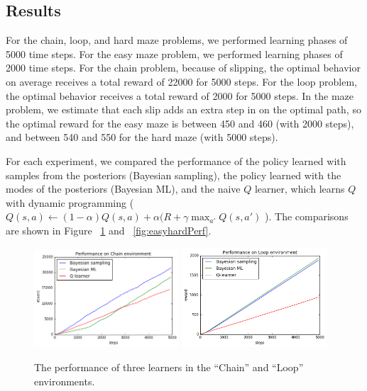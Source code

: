 \documentclass[10pt, twocolumn, twoside]{article}
\begin{document}
\subsection{Results}
For the chain, loop, and hard maze problems, we performed learning phases of 5000 time steps. For
the easy maze problem, we performed learning phases of 2000 time steps. For the chain problem,
because of slipping, the optimal behavior on average receives a total reward of 22000 for
5000 steps. For the loop problem, the optimal behavior receives a total reward of 2000
for 5000 steps. In the maze problem, we estimate that each slip adds an extra step in on the optimal
path, so the optimal reward for the easy maze is between 450 and 460 (with 2000 steps),
and between 540 and 550 for the hard maze (with 5000 steps).

For each experiment, we compared the performance of the policy learned with samples from the posteriors
(Bayesian sampling), the policy learned with the modes of the posteriors (Bayesian ML), and the naive $Q$
learner, which learns $Q$ with dynamic programming (
$Q(s, a) \leftarrow (1 - \alpha)Q(s,a) + \alpha(R + \gamma \max_{a'}Q(s, a')$
). The comparisons are shown in Figure ~\ref{fig:chainloopPerf} and
~\ref{fig:easyhardPerf}.

\begin{figure}
\centering
\includegraphics[width=0.48\textwidth]{chainPerf.png}
\includegraphics[width=0.48\textwidth]{loopPerf.png}
\caption{\label{fig:chainloopPerf} The performance of three learners in the ``Chain'' and ``Loop''
environments.}
\end{figure}
\end{document}
